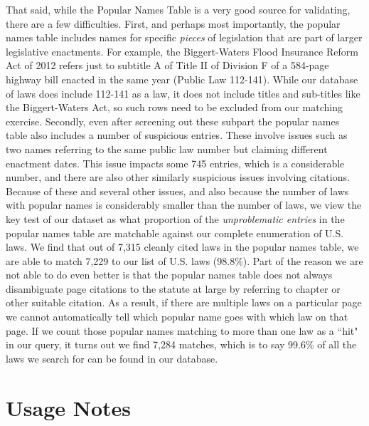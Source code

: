 \documentclass[fleqn,10pt]{wlscirep}
\begin{document}
That said, while the Popular Names Table is a very good source for validating, there are a few difficulties. First, and perhaps most importantly, the popular names table includes names for specific \textit{pieces} of legislation that are part of larger legislative enactments. For example, the Biggert-Waters Flood Insurance Reform Act of 2012 refers just to subtitle A of Title II of Division F of a 584-page highway bill enacted in the same year (Public Law  112-141). While our database of laws does include 112-141 as a law, it does not include titles and sub-titles like the Biggert-Waters Act, so such rows need to be excluded from our matching exercise. Secondly, even after screening out these subpart the popular names table also includes a number of suspicious entries. These involve issues such as two names referring to the same public law number but claiming different enactment dates. This issue impacts some 745 entries, which is a considerable number, and there are also other similarly suspicious issues involving citations. Because of these and several other issues, and also because the number of laws with popular names is considerably smaller than the number of laws, we view the key test of our dataset as what proportion of the \textit{unproblematic entries} in the popular names table are matchable against our complete enumeration of U.S. laws. We find that out of 7,315 cleanly cited laws in the popular names table, we are able to match 7,229 to our list of U.S. laws (98.8\%). Part of the reason we are not able to do even better is that the popular names table does not always disambiguate page citations to the statute at large by referring to chapter or other suitable citation. As a result, if there are multiple laws on a particular page we cannot automatically tell which popular name goes with which law on that page. If we count those popular names matching to more than one law as a ``hit" in our query, it turns out we find 7,284 matches, which is to say 99.6\% of all the laws we search for can be found in our database. 

\section*{Usage Notes}  \label{sec:usage}
\end{document}
